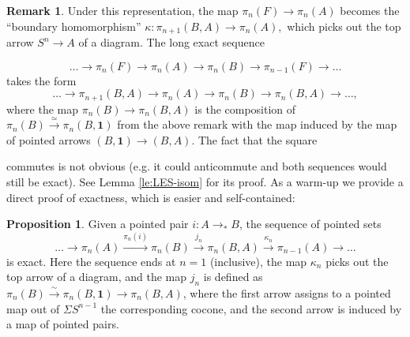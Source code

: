 \documentclass{amsart}
\theoremstyle{definition}
\newtheorem{prp}[theorem]{Proposition}
\newtheorem{re}[theorem]{Remark}
\newcommand{\pto}{\to_*}
\newcommand{\sgtn}{\mathbf{1}}
\begin{document}
\begin{re}\label{LES}
    Under this representation, the map $\pi_n(F) \to \pi_n(A)$ becomes the ``boundary homomorphism'' $\kappa: \pi _{n+1}(B,A) \to \pi_{n}(A),$ which picks out the top arrow $S^{n} \to A$ of a diagram. The long exact sequence

    $$\ldots \to \pi_n(F) \to \pi_n(A) \to \pi_n(B) \to \pi_{n-1}(F) \to \ldots$$
    takes the form
    $$\ldots \to \pi_{n+1}(B,A) \to \pi_n(A) \to \pi_n(B) \to \pi_n(B,A) \to \ldots,$$
    where the map $\pi_n(B) \to \pi_n(B,A)$ is the composition of $\pi_n(B) \xrightarrow{\simeq} \pi_n(B, \sgtn)$ from the above remark with the map induced by the map of pointed arrows $(B, \sgtn) \to (B, A)$. The fact that the square
    commutes is not obvious (e.g. it could anticommute and both sequences would still be exact). See Lemma \ref{le:LES-isom} for its proof.
    As a warm-up we provide a direct proof of exactness, which is easier and self-contained:
\end{re}
\begin{prp}\label{prp:LESproof}
    Given a pointed pair $i: A \pto B$, the sequence of pointed sets
     $$\ldots \to \pi_n(A) \xrightarrow{\pi_n(i)} \pi_n(B) \xrightarrow{j_n} \pi_n(B,A) \xrightarrow{\kappa_n} \pi_{n-1}(A) \to \ldots$$
    is exact. Here the sequence ends at $n = 1$ (inclusive), the map $\kappa_n$ picks out the top arrow of a diagram, and the map $j_n$ is defined as $\pi_n(B) \xrightarrow{\sim} \pi_n(B,\sgtn) \to \pi_n(B,A)$, where the first arrow assigns to a pointed map out of $\Sigma S^{n-1}$ the corresponding cocone, and the second arrow is induced by a map of pointed pairs.
\end{prp}
\end{document}
